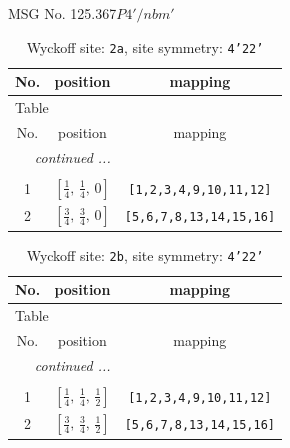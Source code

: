 \documentclass[fleqn,8pt]{jsarticle}
\begin{document}
\setcounter{MaxMatrixCols}{32}

\renewcommand{\tablename}{Table~}
\renewcommand{\figurename}{Figure~}
\begin{center}
\LARGE
MSG No. 125.367\quad$P4'/nbm'$
\end{center}
\renewcommand{\arraystretch}{1.2}
\begin{longtable}{ccc}
\caption{Wyckoff site: {\tt 2a}, site symmetry: {\tt 4'22'}}
 \\
 \hline \hline
No. & position & mapping \\ \hline \endfirsthead

\multicolumn{2}{l}{\tablename\ \thetable{}} \\
 \hline \hline
No. & position & mapping \\ \hline \endhead

 \hline \hline
\multicolumn{2}{r}{\footnotesize\it continued ...} \\ \endfoot

 \hline \hline
\multicolumn{2}{r}{} \\ \endlastfoot

1 & $\left[ \frac{1}{4},\, \frac{1}{4},\, 0 \right]$ & {\tt [1,2,3,4,9,10,11,12]} \\ \hline
2 & $\left[ \frac{3}{4},\, \frac{3}{4},\, 0 \right]$ & {\tt [5,6,7,8,13,14,15,16]} \\
\end{longtable}
\renewcommand{\arraystretch}{1.2}
\begin{longtable}{ccc}
\caption{Wyckoff site: {\tt 2b}, site symmetry: {\tt 4'22'}}
 \\
 \hline \hline
No. & position & mapping \\ \hline \endfirsthead

\multicolumn{2}{l}{\tablename\ \thetable{}} \\
 \hline \hline
No. & position & mapping \\ \hline \endhead

 \hline \hline
\multicolumn{2}{r}{\footnotesize\it continued ...} \\ \endfoot

 \hline \hline
\multicolumn{2}{r}{} \\ \endlastfoot

1 & $\left[ \frac{1}{4},\, \frac{1}{4},\, \frac{1}{2} \right]$ & {\tt [1,2,3,4,9,10,11,12]} \\ \hline
2 & $\left[ \frac{3}{4},\, \frac{3}{4},\, \frac{1}{2} \right]$ & {\tt [5,6,7,8,13,14,15,16]} \\
\end{longtable}
\end{document}
